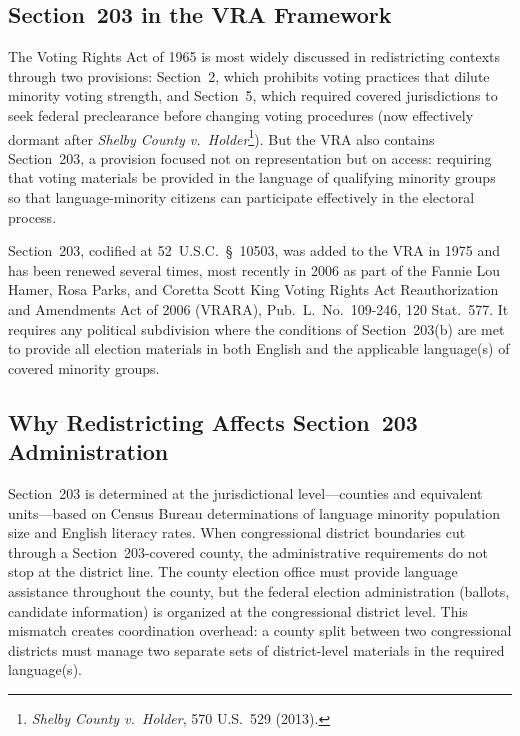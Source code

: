 \label{sec:introduction}

\subsection{Section~203 in the VRA Framework}

The Voting Rights Act of 1965 is most widely discussed in redistricting
contexts through two provisions: Section~2, which prohibits voting
practices that dilute minority voting strength, and Section~5, which
required covered jurisdictions to seek federal preclearance before changing
voting procedures (now effectively dormant after
\textit{Shelby County v.\ Holder}\footnote{\textit{Shelby County
v.\ Holder}, 570 U.S.\ 529 (2013).}). But the VRA also contains
Section~203, a provision focused not on representation but on access:
requiring that voting materials be provided in the language of
qualifying minority groups so that language-minority citizens can
participate effectively in the electoral process.

Section~203, codified at 52~U.S.C.~\S~10503, was added to the VRA in 1975
and has been renewed several times, most recently in 2006 as part of the
Fannie Lou Hamer, Rosa Parks, and Coretta Scott King Voting Rights Act
Reauthorization and Amendments Act of 2006 (VRARA), Pub.\ L.\ No.\ 109-246,
120 Stat.\ 577. It requires any political subdivision where the conditions
of Section~203(b) are met to provide all election materials in both English
and the applicable language(s) of covered minority groups.

\subsection{Why Redistricting Affects Section~203 Administration}

Section~203 is determined at the jurisdictional level---counties and
equivalent units---based on Census Bureau determinations of language
minority population size and English literacy rates. When congressional
district boundaries cut through a Section~203-covered county, the
administrative requirements do not stop at the district line. The county
election office must provide language assistance throughout the county,
but the federal election administration (ballots, candidate information)
is organized at the congressional district level. This mismatch creates
coordination overhead: a county split between two congressional districts
must manage two separate sets of district-level materials in the required
language(s).

